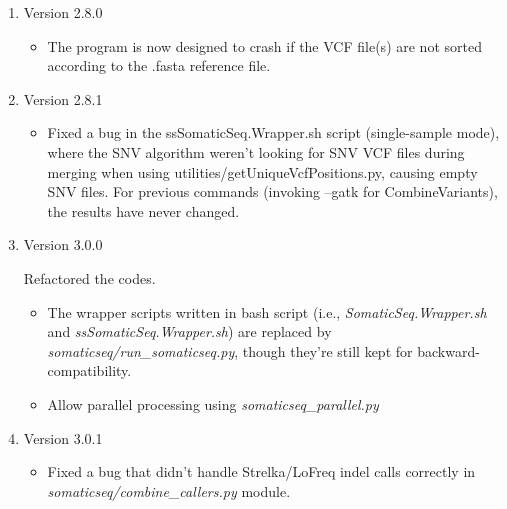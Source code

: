 \documentclass[10pt,letterpaper]{article}
\begin{document}
\begin{sloppypar}
\begin{enumerate}
\begin{itemize}
		\end{itemize}
	
	
	
	\item Version 2.8.0
	
		\begin{itemize}
		
		  \item
		  The program is now designed to crash if the VCF file(s) are not sorted according to the .fasta reference file. 
		  
		\end{itemize}
	
	
	
	\item Version 2.8.1
	
		\begin{itemize}
		
		  \item
		  Fixed a bug in the ssSomaticSeq.Wrapper.sh script (single-sample mode), where the SNV algorithm weren't looking for SNV VCF files during merging when using utilities/getUniqueVcfPositions.py, causing empty SNV files. For previous commands (invoking --gatk for CombineVariants), the results have never changed. 
		  
		\end{itemize}
	
	
	
	\item Version 3.0.0
	
		Refactored the codes.
		  
			\begin{itemize}
		
		     	\item The wrapper scripts written in bash script (i.e., \textit{SomaticSeq.Wrapper.sh} and \textit{ssSomaticSeq.Wrapper.sh}) are replaced by \textit{somaticseq/run\_somaticseq.py}, though they're still kept for backward-compatibility. 
		     
		    	    \item Allow parallel processing using \textit{somaticseq\_parallel.py}
		
		    \end{itemize}
	
	
	\item Version 3.0.1
		\begin{itemize}
		
		  \item
		  Fixed a bug that didn't handle Strelka/LoFreq indel calls correctly in \textit{somaticseq/combine\_callers.py} module.
		  

\end{itemize}
\end{enumerate}
\end{sloppypar}
\end{document}
